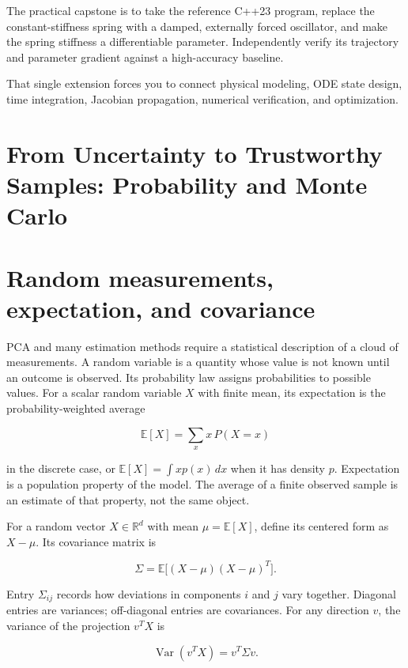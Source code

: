The practical capstone is to take the reference C++23 program, replace the constant-stiffness spring with a damped, externally forced oscillator, and make the spring stiffness a differentiable parameter. Independently verify its trajectory and parameter gradient against a high-accuracy baseline.

That single extension forces you to connect physical modeling, ODE state design, time integration, Jacobian propagation, numerical verification, and optimization.

\section{From Uncertainty to Trustworthy Samples: Probability and Monte Carlo}\label{02-foundations-ii-ch022-from-uncertainty-to-trustworthy-samples-probability-and-monte-carlo}

\section{Random measurements, expectation, and covariance}\label{02-foundations-ii-ch022-random-measurements-expectation-and-covariance}

PCA and many estimation methods require a statistical description of a cloud of measurements. A random variable is a quantity whose value is not known until an outcome is observed. Its probability law assigns probabilities to possible values. For a scalar random variable \(X\) with finite mean, its expectation is the probability-weighted average

\[
\mathbb E[X]=\sum_x x\,P(X=x)
\]

in the discrete case, or \(\mathbb E[X]=\int x p(x)\,dx\) when it has density \(p\). Expectation is a population property of the model. The average of a finite observed sample is an estimate of that property, not the same object.

For a random vector \(X\in\mathbb R^d\) with mean \(\mu=\mathbb E[X]\), define its centered form as \(X-\mu\). Its covariance matrix is

\[
\Sigma=\mathbb E\big[(X-\mu)(X-\mu)^T\big].
\]

Entry \(\Sigma_{ij}\) records how deviations in components \(i\) and \(j\) vary together. Diagonal entries are variances; off-diagonal entries are covariances. For any direction \(v\), the variance of the projection \(v^TX\) is

\[
\operatorname{Var}(v^TX)=v^T\Sigma v.
\]

